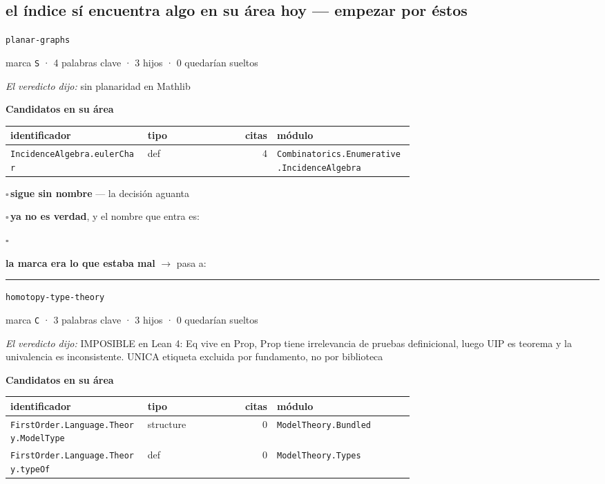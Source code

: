 \documentclass[10pt,a4paper]{article}
\begin{document}
\subsection*{el índice \textbf{sí} encuentra algo en su área hoy — empezar por éstos}
\noindent\texttt{planar-\allowbreak{}graphs}\par
{\small\color{suave}marca \texttt{S} · 4 palabras clave · 3 hijos · 0 quedarían sueltos}\par\smallskip
{\small\emph{El veredicto dijo:} sin planaridad en Mathlib}\par\smallskip
{\small\textbf{Candidatos en su área}}\par\smallskip
\noindent\small\begin{tabular}{@{}>{\raggedright\arraybackslash}p{0.34\linewidth}l r>{\raggedright\arraybackslash}p{0.34\linewidth}@{}}\toprule
identificador & tipo & citas & módulo\\\midrule
\texttt{IncidenceAlgebra.\allowbreak{}eulerChar} & def & 4 & \texttt{Combinatorics.\allowbreak{}Enumerative.\allowbreak{}IncidenceAlgebra}\\
\bottomrule\end{tabular}\par\smallskip
\noindent$\square$\,{\small \textbf{sigue sin nombre} — la decisión aguanta}\par
\noindent$\square$\,{\small \textbf{ya no es verdad}, y el nombre que entra es: \dotfill}\par
\noindent$\square$\,{\small \textbf{la marca era lo que estaba mal} $\rightarrow$ pasa a: \rule{2em}{0.4pt}}\par
\medskip
\noindent\texttt{homotopy-\allowbreak{}type-\allowbreak{}theory}\par
{\small\color{suave}marca \texttt{C} · 3 palabras clave · 3 hijos · 0 quedarían sueltos}\par\smallskip
{\small\emph{El veredicto dijo:} IMPOSIBLE en Lean 4: Eq vive en Prop, Prop tiene irrelevancia de pruebas definicional, luego UIP es teorema y la univalencia es inconsistente. UNICA etiqueta excluida por fundamento, no por biblioteca}\par\smallskip
{\small\textbf{Candidatos en su área}}\par\smallskip
\noindent\small\begin{tabular}{@{}>{\raggedright\arraybackslash}p{0.34\linewidth}l r>{\raggedright\arraybackslash}p{0.34\linewidth}@{}}\toprule
identificador & tipo & citas & módulo\\\midrule
\texttt{FirstOrder.\allowbreak{}Language.\allowbreak{}Theory.\allowbreak{}ModelType} & structure & 0 & \texttt{ModelTheory.\allowbreak{}Bundled}\\
\texttt{FirstOrder.\allowbreak{}Language.\allowbreak{}Theory.\allowbreak{}typeOf} & def & 0 & \texttt{ModelTheory.\allowbreak{}Types}\\
\bottomrule\end{tabular}\par\smallskip
\end{document}
